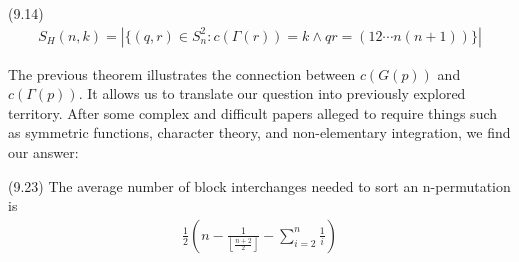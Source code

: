 \begin{theorem}
(9.14) 
\begin{align*}
S_H(n,k) = | \{ (q,r) \in S_n^2 : c(\Gamma (r)) = k \wedge qr = (12 \cdots n(n+1)) \} |
\end{align*}
\end{theorem}

The previous theorem illustrates the connection between $c(G(p))$ and $c(\Gamma (p))$. It allows us to translate our question into previously explored territory. After some complex and difficult papers alleged to require things such as symmetric functions, character theory, and non-elementary integration, we find our answer:

\begin{theorem}
(9.23) The average number of block interchanges needed to sort an n-permutation is
\begin{align*}
\frac{1}{2} \left( n- \frac{1}{ \left \lfloor{\frac{n+2}{2}}\right \rfloor} - \sum^n_{i=2} \frac{1}{i} \right)
\end{align*}\end{theorem}

\begin{appendix}


\end{appendix}


